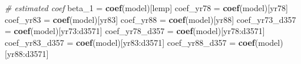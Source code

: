 \documentclass[
]{article}
\newenvironment{Shaded}{\begin{snugshade}}{\end{snugshade}}
\newcommand{\CommentTok}[1]{\textcolor[rgb]{0.56,0.35,0.01}{\textit{#1}}}
\newcommand{\FunctionTok}[1]{\textcolor[rgb]{0.13,0.29,0.53}{\textbf{#1}}}
\newcommand{\NormalTok}[1]{#1}
\newcommand{\OtherTok}[1]{\textcolor[rgb]{0.56,0.35,0.01}{#1}}
\newcommand{\StringTok}[1]{\textcolor[rgb]{0.31,0.60,0.02}{#1}}
\begin{document}
\begin{Shaded}
\begin{Highlighting}[]
\CommentTok{\# estimated coef}
\NormalTok{beta\_1 }\OtherTok{=} \FunctionTok{coef}\NormalTok{(model)[}\StringTok{\textquotesingle{}lemp\textquotesingle{}}\NormalTok{]}
\NormalTok{coef\_yr78 }\OtherTok{=} \FunctionTok{coef}\NormalTok{(model)[}\StringTok{\textquotesingle{}yr78\textquotesingle{}}\NormalTok{]}
\NormalTok{coef\_yr83 }\OtherTok{=} \FunctionTok{coef}\NormalTok{(model)[}\StringTok{\textquotesingle{}yr83\textquotesingle{}}\NormalTok{]}
\NormalTok{coef\_yr88 }\OtherTok{=} \FunctionTok{coef}\NormalTok{(model)[}\StringTok{\textquotesingle{}yr88\textquotesingle{}}\NormalTok{]}
\NormalTok{coef\_yr73\_d357 }\OtherTok{=} \FunctionTok{coef}\NormalTok{(model)[}\StringTok{\textquotesingle{}yr73:d3571\textquotesingle{}}\NormalTok{]}
\NormalTok{coef\_yr78\_d357 }\OtherTok{=} \FunctionTok{coef}\NormalTok{(model)[}\StringTok{\textquotesingle{}yr78:d3571\textquotesingle{}}\NormalTok{]}
\NormalTok{coef\_yr83\_d357 }\OtherTok{=} \FunctionTok{coef}\NormalTok{(model)[}\StringTok{\textquotesingle{}yr83:d3571\textquotesingle{}}\NormalTok{]}
\NormalTok{coef\_yr88\_d357 }\OtherTok{=} \FunctionTok{coef}\NormalTok{(model)[}\StringTok{\textquotesingle{}yr88:d3571\textquotesingle{}}\NormalTok{]}


\end{Highlighting}
\end{Shaded}
\end{document}
